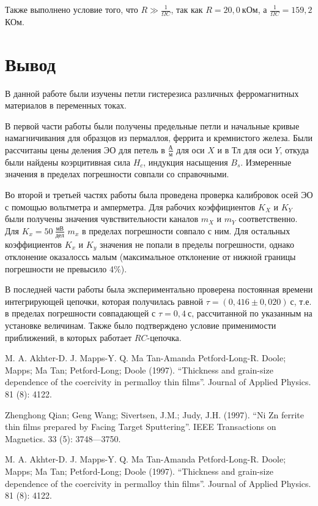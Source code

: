 \documentclass[a4paper,10pt]{article}
\begin{document}
Также выполнено условие того, что $R\gg\frac{1}{\Omega C}$, так как $R=20,0~\text{кОм}$, а $\frac{1}{\Omega C}=159,2$ КОм.

\section*{Вывод}


В данной работе были изучены петли гистерезиса различных ферромагнитных материалов в переменных токах.

В первой части работы были получены предельные петли и начальные кривые намагничивания для образцов из пермаллоя, феррита и кремнистого железа. Были рассчитаны цены деления ЭО для петель в $\frac{\text{А}}{\text{м}}$ для оси $X$ и в $\text{Тл}$ для оси $Y$, откуда были найдены коэрцитивная сила $H_c$, индукция насыщения $B_s$. Измеренные значения в пределах погрешности совпали со справочными.

Во второй и третьей частях работы была проведена проверка калибровок осей ЭО с помощью вольтметра и амперметра. Для рабочих коэффициентов $K_X$ и $K_Y$  были получены значения чувствительности каналов $m_X$ и $m_Y$ соответственно. Для $K_x = 50 ~\frac{\text{мВ}}{\text{дел}}$  $m_x$ в пределах погрешности совпало с ним. Для остальных коэффициентов $K_x$ и $K_y$ значения не попали в пределы погрешности, однако отклонение оказалоссь малым (максимальное отклонение от нижной границы погрешности не превысило 4$\%$).

В последней части работы  была экспериментально проверена постоянная времени интегрирующей цепочки, которая получилась равной $\tau=\left(0,416\pm0,020\right)~\text{с}$, т.е. в пределах погрешности совпадающей с $\tau=0,4~\text{с}$, рассчитанной по указанным на установке величинам. Также было подтверждено условие применимости приближений, в которых работает $RC$-цепочка. 
\begin{thebibliography}{3}
	
	 M. A. Akhter-D. J. Mapps-Y. Q. Ma Tan-Amanda Petford-Long-R. Doole; Mapps; Ma Tan; Petford-Long; Doole (1997). “Thickness and grain-size dependence of the coercivity in permalloy thin films”. Journal of Applied Physics. 81 (8): 4122.
	 
	Zhenghong Qian; Geng Wang; Sivertsen, J.M.; Judy, J.H. (1997). “Ni Zn ferrite thin films prepared by Facing Target Sputtering”. IEEE Transactions on Magnetics. 33 (5): 3748—3750.
	
	M. A. Akhter-D. J. Mapps-Y. Q. Ma Tan-Amanda Petford-Long-R. Doole; Mapps; Ma Tan; Petford-Long; Doole (1997). “Thickness and grain-size dependence of the coercivity in permalloy thin films”. Journal of Applied Physics. 81 (8): 4122. 
	
\end{thebibliography} 
\end{document}
